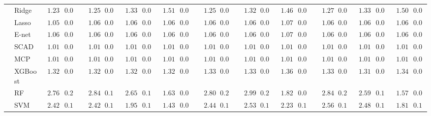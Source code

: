 \begin{tabular}{ll|ll|llllll|llllll|llllll}
 & Ridge  & $\phantom{0}1.23$ & $0.06$ & $\phantom{00}1.25$ & $0.07$ & $\phantom{0}1.33$ & $0.08$ & $\phantom{0}1.51$ & $0.09$ & $\phantom{00}1.25$ & $0.06$ & $\phantom{00}1.32$ & $0.08$ & $\phantom{0}1.46$ & $0.08$ & $\phantom{00}1.27$ & $0.07$ & $\phantom{0}1.33$ & $0.07$ & $\phantom{0}1.50$ & $0.08$ \\
 & Lasso  & $\phantom{0}1.05$ & $0.05$ & $\phantom{00}1.06$ & $0.05$ & $\phantom{0}1.06$ & $0.05$ & $\phantom{0}1.06$ & $0.05$ & $\phantom{00}1.06$ & $0.05$ & $\phantom{00}1.06$ & $0.05$ & $\phantom{0}1.07$ & $0.05$ & $\phantom{00}1.06$ & $0.05$ & $\phantom{0}1.06$ & $0.05$ & $\phantom{0}1.06$ & $0.05$ \\
 & E-net  & $\phantom{0}1.06$ & $0.05$ & $\phantom{00}1.06$ & $0.05$ & $\phantom{0}1.06$ & $0.05$ & $\phantom{0}1.06$ & $0.05$ & $\phantom{00}1.06$ & $0.05$ & $\phantom{00}1.06$ & $0.05$ & $\phantom{0}1.07$ & $0.05$ & $\phantom{00}1.06$ & $0.05$ & $\phantom{0}1.06$ & $0.05$ & $\phantom{0}1.06$ & $0.05$ \\
 & SCAD  & $\phantom{0}1.01$ & $0.04$ & $\phantom{00}1.01$ & $0.04$ & $\phantom{0}1.01$ & $0.04$ & $\phantom{0}1.01$ & $0.04$ & $\phantom{00}1.01$ & $0.04$ & $\phantom{00}1.01$ & $0.04$ & $\phantom{0}1.01$ & $0.05$ & $\phantom{00}1.01$ & $0.04$ & $\phantom{0}1.01$ & $0.04$ & $\phantom{0}1.01$ & $0.04$ \\
 & MCP  & $\phantom{0}1.01$ & $0.04$ & $\phantom{00}1.01$ & $0.04$ & $\phantom{0}1.01$ & $0.04$ & $\phantom{0}1.01$ & $0.04$ & $\phantom{00}1.01$ & $0.04$ & $\phantom{00}1.01$ & $0.04$ & $\phantom{0}1.01$ & $0.05$ & $\phantom{00}1.01$ & $0.04$ & $\phantom{0}1.01$ & $0.04$ & $\phantom{0}1.01$ & $0.04$ \\
 & XGBoost  & $\phantom{0}1.32$ & $0.07$ & $\phantom{00}1.32$ & $0.07$ & $\phantom{0}1.32$ & $0.07$ & $\phantom{0}1.32$ & $0.08$ & $\phantom{00}1.33$ & $0.08$ & $\phantom{00}1.33$ & $0.07$ & $\phantom{0}1.36$ & $0.08$ & $\phantom{00}1.33$ & $0.07$ & $\phantom{0}1.31$ & $0.06$ & $\phantom{0}1.34$ & $0.09$ \\
 & RF  & $\phantom{0}2.76$ & $0.21$ & $\phantom{00}2.84$ & $0.19$ & $\phantom{0}2.65$ & $0.18$ & $\phantom{0}1.63$ & $0.09$ & $\phantom{00}2.80$ & $0.21$ & $\phantom{00}2.99$ & $0.20$ & $\phantom{0}1.82$ & $0.08$ & $\phantom{00}2.84$ & $0.21$ & $\phantom{0}2.59$ & $0.14$ & $\phantom{0}1.57$ & $0.08$ \\
 & SVM  & $\phantom{0}2.42$ & $0.15$ & $\phantom{00}2.42$ & $0.17$ & $\phantom{0}1.95$ & $0.14$ & $\phantom{0}1.43$ & $0.09$ & $\phantom{00}2.44$ & $0.14$ & $\phantom{00}2.53$ & $0.15$ & $\phantom{0}2.23$ & $0.13$ & $\phantom{00}2.56$ & $0.14$ & $\phantom{0}2.48$ & $0.15$ & $\phantom{0}1.81$ & $0.12$ \\\hline

\end{tabular}
